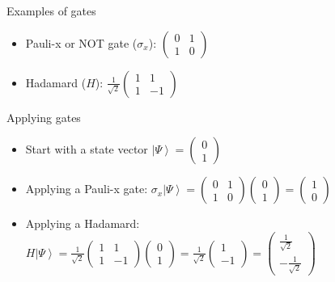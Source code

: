 \documentclass[14pt]{beamer}
\newcommand{\braket}[1]{\ensuremath{\left | #1 \right \rangle}}
\begin{document}
\begin{frame}{Examples of gates}
\begin{itemize}
	\item Pauli-x or NOT gate ($\sigma_x$): $\begin{pmatrix} 0 & 1 \\ 1 & 0 \end{pmatrix}$
	\item Hadamard ($H$): $\frac{1}{\sqrt{2}}\begin{pmatrix} 1 & 1 \\ 1 & -1 \end{pmatrix}$
\end{itemize}
\end{frame}

\begin{frame}{Applying gates}
\begin{itemize}
	\item Start with a state vector $\braket{\Psi} = \begin{pmatrix}0 \\ 1\end{pmatrix}$
	\item Applying a Pauli-x gate: $\sigma_x \braket{\Psi} = \begin{pmatrix} 0 & 1 \\ 1 & 0 \end{pmatrix}\begin{pmatrix}0 \\ 1\end{pmatrix} = \begin{pmatrix}1 \\ 0\end{pmatrix}$
	\item Applying a Hadamard: $H \braket{\Psi} = \frac{1}{\sqrt{2}}\begin{pmatrix} 1 & 1 \\ 1 & -1 \end{pmatrix}\begin{pmatrix}0 \\ 1\end{pmatrix} = \frac{1}{\sqrt{2}}\begin{pmatrix}1 \\ -1\end{pmatrix} = \begin{pmatrix}\frac{1}{\sqrt{2}} \\ -\frac{1}{\sqrt{2}}\end{pmatrix}$
	
\end{itemize}
\end{frame}
\end{document}
